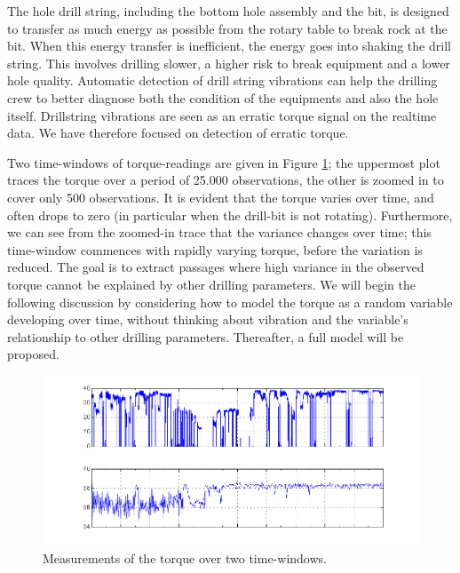 The hole drill string, including the bottom hole assembly and the bit, is designed to transfer as much energy as possible from the rotary table to break rock at the bit.  When this energy transfer is inefficient, the energy goes into shaking the drill string.  This involves drilling slower, a higher risk to break equipment and a lower hole quality. Automatic detection of drill string vibrations can help the drilling crew to better diagnose both the condition of the equipments and also the hole itself. Drillstring vibrations are seen as an erratic torque signal on the realtime data.  We have therefore focused on detection of erratic torque.

Two time-windows of torque-readings are given in Figure \ref{Figure:VTTorqueValues}; the uppermost plot traces the torque over a period of 25.000 observations, the other is zoomed in to cover only 500 observations. It is evident that the torque varies over time, and often drops to zero (in particular when the drill-bit is not rotating). Furthermore, we can see from the zoomed-in trace that the variance changes over time; this time-window commences with rapidly varying torque, before the variation is reduced. The goal is to extract passages where high variance in the observed torque cannot be explained by other drilling parameters. 
We will begin the following discussion by considering how to model the torque as a random variable developing over time, without thinking about vibration and the variable's relationship to other drilling parameters. Thereafter, a full model will be proposed.

\begin{figure}[ht!]
\begin{center}
\includegraphics[scale=0.3]{./figures/VT_TRQ_values} 
\caption{\label{Figure:VTTorqueValues} Measurements of the torque over two time-windows.}
\end{center}
\end{figure}

